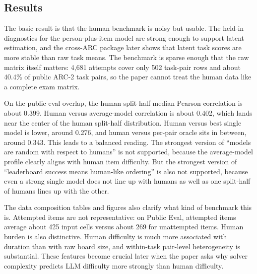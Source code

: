 \documentclass[11pt,letterpaper]{article}
\begin{document}
\subsection{Results}

The basic result is that the human benchmark is noisy but usable. The held-in diagnostics for the person-plus-item model are strong enough to support latent estimation, and the cross-ARC package later shows that latent task scores are more stable than raw task means. The benchmark is sparse enough that the raw matrix itself matters: 4,681 attempts cover only 502 task-pair rows and about 40.4\% of public ARC-2 task pairs, so the paper cannot treat the human data like a complete exam matrix.

On the public-eval overlap, the human split-half median Pearson correlation is about 0.399. Human versus average-model correlation is about 0.402, which lands near the center of the human split-half distribution. Human versus best single model is lower, around 0.276, and human versus per-pair oracle sits in between, around 0.343. This leads to a balanced reading. The strongest version of ``models are random with respect to humans'' is not supported, because the average-model profile clearly aligns with human item difficulty. But the strongest version of ``leaderboard success means human-like ordering'' is also not supported, because even a strong single model does not line up with humans as well as one split-half of humans lines up with the other.

The data composition tables and figures also clarify what kind of benchmark this is. Attempted items are not representative: on Public Eval, attempted items average about 425 input cells versus about 269 for unattempted items. Human burden is also distinctive. Human difficulty is much more associated with duration than with raw board size, and within-task pair-level heterogeneity is substantial. These features become crucial later when the paper asks why solver complexity predicts LLM difficulty more strongly than human difficulty.
\end{document}
